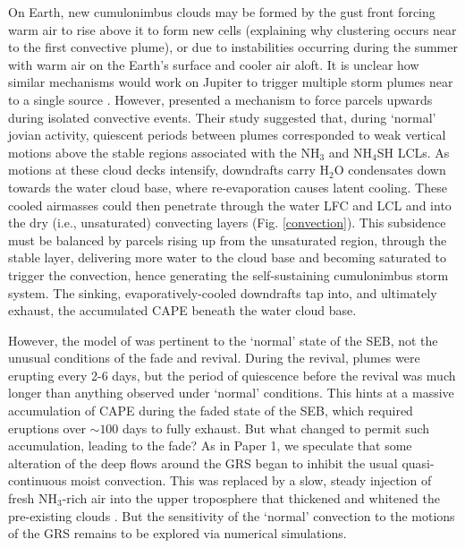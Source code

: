 \documentclass[final,authoryear,5p,times,twocolumn]{elsarticle}
\begin{document}
On Earth, new cumulonimbus clouds may be formed by the gust front forcing warm air to rise above it to form new cells (explaining why clustering occurs near to the first convective plume), or due to instabilities occurring during the summer with warm air on the Earth's surface and cooler air aloft.  It is unclear how similar mechanisms would work on Jupiter to trigger multiple storm plumes near to a single source \citep[e.g.,][]{02hueso}.  However, \citet{14sugiyama} presented a mechanism to force parcels upwards during isolated convective events.  Their study suggested that, during `normal' jovian activity, quiescent periods between plumes corresponded to weak vertical motions above the stable regions associated with the NH$_3$ and NH$_4$SH LCLs.   As motions at these cloud decks intensify, downdrafts carry H$_2$O condensates down towards the water cloud base, where re-evaporation causes latent cooling.   These cooled airmasses could then penetrate through the water LFC and LCL and into the dry (i.e., unsaturated) convecting layers (Fig. \ref{convection}).  This subsidence must be balanced by parcels rising up from the unsaturated region, through the stable layer, delivering more water to the cloud base and becoming saturated to trigger the convection, hence generating the self-sustaining cumulonimbus storm system.  The sinking, evaporatively-cooled downdrafts tap into, and ultimately exhaust, the accumulated CAPE beneath the water cloud base.  


However, the model of \citet{14sugiyama} was pertinent to the `normal' state of the SEB, not the unusual conditions of the fade and revival.  During the revival, plumes were erupting every 2-6 days, but the period of quiescence before the revival was much longer than anything observed under `normal' conditions. This hints at a massive accumulation of CAPE during the faded state of the SEB, which required eruptions over $\sim100$ days to fully exhaust. But what changed to permit such accumulation, leading to the fade?  As in Paper 1, we speculate that some alteration of the deep flows around the GRS began to inhibit the usual quasi-continuous moist convection.  This was replaced by a slow, steady injection of fresh NH$_3$-rich air into the upper troposphere that thickened and whitened the pre-existing clouds \citep{12perezhoyos}.  But the sensitivity of the `normal' convection to the motions of the GRS remains to be explored via numerical simulations.  
\end{document}
